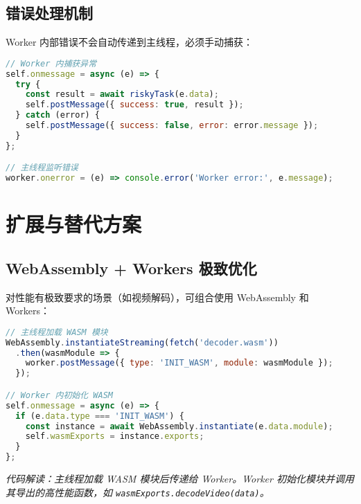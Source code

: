 \section{错误处理机制}
Worker 内部错误不会自动传递到主线程，必须手动捕获：\par
\begin{lstlisting}[language=javascript]
// Worker 内捕获异常
self.onmessage = async (e) => {
  try {
    const result = await riskyTask(e.data);
    self.postMessage({ success: true, result });
  } catch (error) {
    self.postMessage({ success: false, error: error.message });
  }
};

// 主线程监听错误
worker.onerror = (e) => console.error('Worker error:', e.message);
\end{lstlisting}
\chapter{扩展与替代方案}
\section{WebAssembly + Workers 极致优化}
对性能有极致要求的场景（如视频解码），可组合使用 WebAssembly 和 Workers：\par
\begin{lstlisting}[language=javascript]
// 主线程加载 WASM 模块
WebAssembly.instantiateStreaming(fetch('decoder.wasm'))
  .then(wasmModule => {
    worker.postMessage({ type: 'INIT_WASM', module: wasmModule });
  });

// Worker 内初始化 WASM
self.onmessage = async (e) => {
  if (e.data.type === 'INIT_WASM') {
    const instance = await WebAssembly.instantiate(e.data.module);
    self.wasmExports = instance.exports; 
  }
};
\end{lstlisting}
\textit{代码解读：主线程加载 WASM 模块后传递给 Worker。Worker 初始化模块并调用其导出的高性能函数，如 \texttt{wasmExports.decodeVideo(data)}。}\par
